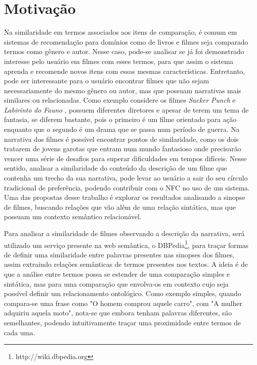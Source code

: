 \section{Motivação}
Na similaridade em termos associados aos itens de comparação, é comum em sistemas de recomendação para domínios como de livros e filmes seja comparado termos como gênero e autor. Nesse caso, pode-se analisar se já foi demonstrado interesse pelo usuário em filmes com esses termos, para que assim o sistema aprenda e recomende novos itens com essas mesmas características. Entretanto, pode ser interessante para o usuário encontrar filmes que não sejam necessariamente do mesmo gênero ou autor, mas que possuam narrativas mais similares ou relacionadas. Como exemplo considere os filmes \textit{Sucker Punch} \citep{SuckerPunch2011} e \textit{Labirinto do Fauno} \citep{LaberintoFauno2006}, possuem diferentes diretores e apesar de terem um tema de fantasia, se diferem bastante, pois o primeiro é um filme orientado para ação enquanto que o segundo é um drama que se passa num período de guerra. Na narrativa dos filmes é possível encontrar pontos de similaridade, como os dois tratarem de jovens garotas que entram num mundo fantasioso onde precisarão vencer uma série de desafios para superar dificuldades em tempos difíceis. Nesse sentido, analisar a similaridade do conteúdo da descrição de um filme que contenha um trecho da sua narrativa, pode levar ao usuário a sair do seu círculo tradicional de preferência, podendo contribuir com o NFC no uso de um sistema. Uma das propostas desse trabalho é explorar os resultados analisando a sinopse de filmes, buscando relações que vão além de uma relação sintática, mas que possuam um contexto semântico relacionável.

Para analisar a similaridade de filmes observando a descrição da narrativa, será utilizado um serviço presente na web semântica, o DBPedia\footnote{http://wiki.dbpedia.org}, para traçar formas de definir uma similaridade entre palavras presentes nas sinopses dos filmes, assim extraindo relações semânticas de termos presentes nos textos. A ideia é de que a análise entre termos possa se estender de uma comparação simples e sintática, mas para uma comparação que envolva-os em contexto cujo seja possível definir um relacionamento ontológico. Como exemplo simples, quando compara-se uma frase como "O homem comprou aquele carro", com "A mulher adquiriu aquela moto", nota-se que embora tenham palavras diferentes, são semelhantes, podendo intuitivamente traçar uma proximidade entre termos de cada uma. 

